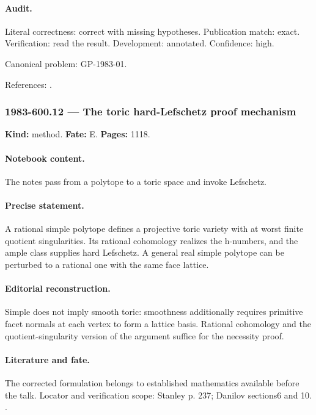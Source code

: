 \paragraph{Audit.} Literal correctness: correct with missing hypotheses. Publication match: exact. Verification: read the result. Development: annotated. Confidence: high.

\noindent Canonical problem: GP-1983-01.\par

\noindent References: \citep{stanley1980faces,stanley1984lefschetz}.\par

\subsubsection{1983-600.12 --- The toric hard-Lefschetz proof mechanism}

\label{item:1983-600.12}

\noindent\textbf{Kind:} method. \textbf{Fate:} E. \textbf{Pages:} 1118.\par

\paragraph{Notebook content.} The notes pass from a polytope to a toric space and invoke Lefschetz.

\paragraph{Precise statement.} A rational simple polytope defines a projective toric variety with at worst finite quotient singularities. Its rational cohomology realizes the h-numbers, and the ample class supplies hard Lefschetz. A general real simple polytope can be perturbed to a rational one with the same face lattice.

\paragraph{Editorial reconstruction.} Simple does not imply smooth toric: smoothness additionally requires primitive facet normals at each vertex to form a lattice basis. Rational cohomology and the quotient-singularity version of the argument suffice for the necessity proof.

\paragraph{Literature and fate.} The corrected formulation belongs to established mathematics available before the talk. Locator and verification scope: Stanley p. 237; Danilov sections6 and 10. \cite{stanley1980faces,danilov1978toric}.

